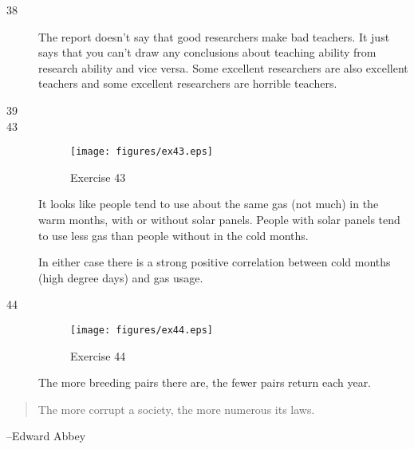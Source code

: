 \documentclass{exam}
\begin{document}
\begin{description}

      \item[38]
        The report doesn't say that good researchers make bad teachers.  It just says that
        you can't draw any conclusions about teaching ability from research ability and
        vice versa.  Some excellent researchers are also excellent teachers and some
        excellent researchers are horrible teachers.

      \item[39]

      \item[43]
        \begin{figure}[H]
          \centering
          \texttt{[image: figures/ex43.eps]}
          \caption{Exercise 43}
        \end{figure}

        It looks like people tend to use about the same gas (not much) in the warm months,
        with or without solar panels.  People with solar panels tend to use less gas than
        people without in the cold months.

        In either case there is a strong positive correlation between cold months (high
        degree days) and gas usage.

      \item[44]
        \begin{figure}[H]
          \centering
          \texttt{[image: figures/ex44.eps]}
          \caption{Exercise 44}
        \end{figure}

        The more breeding pairs there are, the fewer pairs return each year.
    \end{description}


  \else
    \vspace{10 cm}
    \begin{quote}
      \begin{em}
        The more corrupt a society, the more numerous its laws.
      \end{em}
    \end{quote}
    \hspace{1 cm} --Edward Abbey
  \fi
\end{document}
